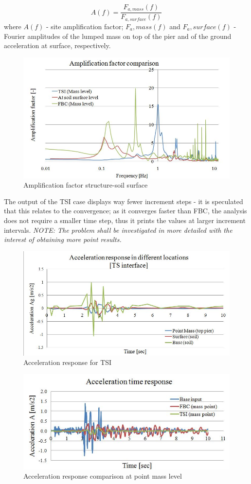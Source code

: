 	\begin{equation}
	A(f)=\frac{F_{a,mass}(f)}{F_{a,surface}(f)}
	\end{equation}
	where $A(f)$ - site amplification factor; $F_a,mass(f)$ and $F_a,surface(f)$ - Fourier amplitudes of the lumped mass on top of the pier and of the ground acceleration at surface, respectively. 

\begin{figure}[!h]
	\centering
	\includegraphics[width=0.7\linewidth]{"amplification"}
	\caption{Amplification factor structure-soil surface}
	\label{ampli}
\end{figure}

The output of the TSI case displays way fewer increment steps - it is speculated that this relates to the convergence; as it converges faster than FBC, the analysis does not require a smaller time step, thus it prints the values at larger increment intervals. \textit{NOTE: The problem shall be investigated in more detailed with the interest of obtaining more point results.}

\begin{figure}[!h]
	\centering
	\includegraphics[width=0.7\linewidth]{"acc_TSI"}
	\caption{Acceleration response for TSI}
	\label{TSIacc}
\end{figure}

\begin{figure}[!h]
	\centering
	\includegraphics[width=0.7\linewidth]{"acc_FBC"}
	\caption{Acceleration response comparison at point mass level}
	\label{FBCacc}
\end{figure}

